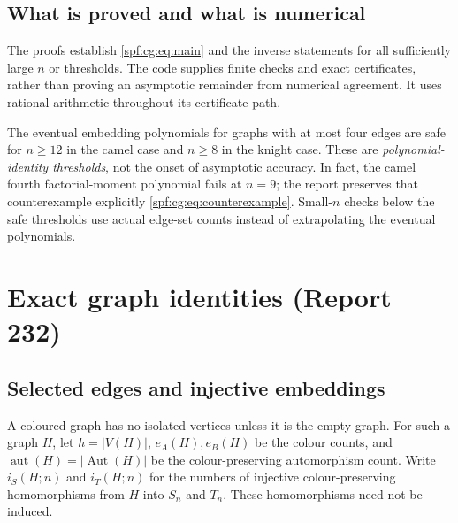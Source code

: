 \documentclass[11pt]{article}
\numberwithin{equation}{section}
\theoremstyle{definition}
\theoremstyle{remark}
\theoremstyle{definition}
\begin{document}
\subsection{What is proved and what is numerical}
The proofs establish \eqref{spf:cg:eq:main} and the inverse statements for all
sufficiently large $n$ or thresholds. The code supplies finite checks and
exact certificates, rather than proving an asymptotic remainder from
numerical agreement. It uses rational arithmetic throughout its certificate
path.

The eventual embedding polynomials for graphs with at most four edges are
safe for $n\ge12$ in the camel case and $n\ge8$ in the knight case. These are
\emph{polynomial-identity thresholds}, not the onset of asymptotic accuracy.
In fact, the camel fourth factorial-moment polynomial fails at $n=9$; the
report preserves that counterexample explicitly
\eqref{spf:cg:eq:counterexample}. Small-$n$ checks below the safe thresholds
use actual edge-set counts instead of extrapolating the eventual
polynomials.

\section{Exact graph identities (Report 232)}
\label{spf:cg:sec:exact}

\subsection{Selected edges and injective embeddings}
A coloured graph has no isolated vertices unless it is the empty graph. For
such a graph $H$, let $h=|V(H)|$, $e_A(H),e_B(H)$ be the colour counts, and
$\operatorname{aut}(H)=|\operatorname{Aut}(H)|$ be the colour-preserving
automorphism count. Write $i_S(H;n)$ and $i_T(H;n)$ for the numbers of
injective colour-preserving homomorphisms from $H$ into $S_n$ and $T_n$.
These homomorphisms need not be induced.
\end{document}
